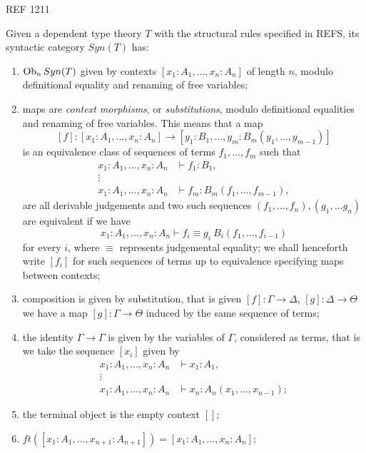 \begin{construction}
  REF 1211

  Given a dependent type theory $T$ with the structural rules specified in REFS,
  its syntactic category $Syn(T)$ has:
  \begin{enumerate}
    \item $\operatorname{Ob}_nSyn(T)$ given by contexts $[x_1:A_1,\ldots,x_n:A_n]$ of length
      $n$, modulo definitional equality and renaming of free variables;
    \item maps are \emph{context morphisms}, or \emph{substitutions}, modulo
      definitional equalities and renaming of free variables. This means that a
      map
      \[[f]\colon[x_1:A_1,\ldots,x_n:A_n]\rightarrow[y_1:B_1,\ldots,y_m:B_m(y_1,\ldots,y_{m-1})]\]
      is an equivalence class of sequences of terms $f_1,\ldots,f_m$ such that
      \begin{align*}
        x_1:A_1,\ldots,x_n:A_n &\vdash f_1:B_1, \\
        \vdots & \\
        x_1:A_1,\ldots,x_n:A_n &\vdash f_m:B_m(f_1,\ldots,f_{m-1}),
      \end{align*}
      are all derivable judgements and two such sequences
      $(f_1,\ldots,f_n),(g_1,\ldots g_n)$ are equivalent if we have
      \[x_1:A_1,\ldots,x_n:A_n\vdash f_i\equiv g_i\:B_i(f_1,\ldots,f_{i-1})\]
      for every $i$, where $\equiv$ represents judgemental equality; we shall
      henceforth write $[f_i]$ for such sequences of terms up to equivalence
      specifying maps between contexts;
    \item composition is given by substitution, that is given
      $[f]\colon\Gamma\rightarrow\Delta$, $[g]\colon\Delta\rightarrow\Theta$ we
      have a map $[g]\colon\Gamma\rightarrow\Theta$ induced by the same sequence
      of terms;
    \item the identity $\Gamma\rightarrow\Gamma$ is given by the variables of
      $\Gamma$, considered as
      terms, that is we take the sequence $[x_i]$ given by
      \begin{align*}
        x_1:A_1,\ldots,x_n:A_n &\vdash x_1:A_1, \\
        \vdots & \\
        x_1:A_1,\ldots,x_n:A_n &\vdash x_n:A_n(x_1,\ldots,x_{n-1});
      \end{align*}
    \item the terminal object is the empty context $[]$;
    \item
      $ft([x_1:A_1,\ldots,x_{n+1}:A_{n+1}])=[x_1:A_1,\ldots,x_n:A_n]$;

\end{enumerate}
\end{construction}
